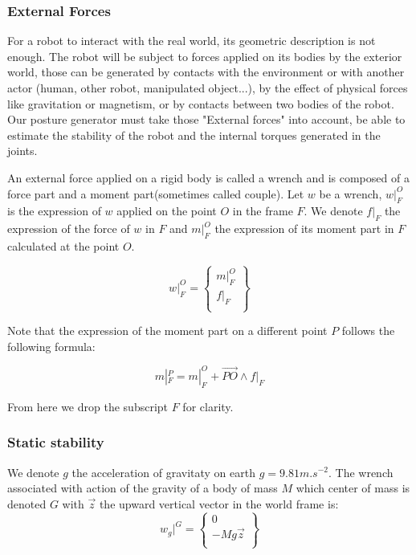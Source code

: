 \subsubsection{External Forces}
\label{subsub:external_forces}

For a robot to interact with the real world, its geometric description is not enough.
The robot will be subject to forces applied on its bodies by the exterior world, those can be generated by contacts with the environment or with another actor (human, other robot, manipulated object...), by the effect of physical forces like gravitation or magnetism, or by contacts between two bodies of the robot.
Our posture generator must take those "External forces" into account, be able to estimate the stability of the robot and the internal torques generated in the joints.

An external force applied on a rigid body is called a wrench and is composed of a force part and a moment part(sometimes called couple).
Let $w$ be a wrench, $w|_F^O$ is the expression of $w$ applied on the point $O$ in the frame $F$.
We denote $f|_F$ the expression of the force of $w$ in $F$ and $m|_F^O$ the expression of its moment part in $F$ calculated at the point $O$.

\begin{equation}
  w|_F^O = \left\{ \begin{array}{r}
    m|_F^O\\
    f|_F\\
  \end{array} \right\}
\end{equation}

Note that the expression of the moment part on a different point $P$ follows the following formula:

\begin{equation}
  m|_F^P = m|_F^O + \overrightarrow{PO} \wedge f|_F
\end{equation}

From here we drop the subscript $F$ for clarity.

\subsubsection{Static stability}
\label{subsub:static_stability}

We denote $g$ the acceleration of gravitaty on earth $g = 9.81 m.s^{-2}$.
The wrench associated with action of the gravity of a body of mass $M$ which center of mass is denoted $G$ with $\vec{z}$ the upward vertical vector in the world frame is:
\begin{equation}
  w_g|^G = \left\{ \begin{array}{r}
     0 \\
     -Mg\vec{z} \\
  \end{array}\right\}
\end{equation}

